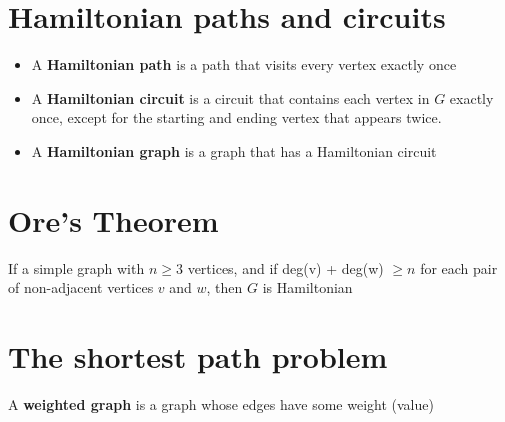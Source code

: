 \documentclass{report}
\begin{document}
    \pagebreak \bigbreak \noindent 
    \section{\LARGE Hamiltonian paths and circuits}
    \bigbreak \noindent 
    \smallbreak \noindent
    \begin{definition}
        \begin{itemize}
            \item A \textbf{Hamiltonian path} is a path that visits every vertex exactly once  
            \item A \textbf{Hamiltonian circuit} is a circuit that contains each vertex in $G$ exactly once, except for the starting and ending vertex that appears twice.
            \item A \textbf{Hamiltonian graph} is a graph that has a Hamiltonian circuit
        \end{itemize}

    \end{definition}

    \pagebreak \bigbreak \noindent 
    \section{\LARGE Ore's Theorem}
    \bigbreak \noindent 
    \begin{thrm}
       If a simple graph with $n \geq 3$ vertices, and if deg(v) + deg(w) $ \geq n$ for each pair of non-adjacent vertices $v$ and $w$, then $G$ is Hamiltonian 
    \end{thrm}

    \pagebreak \bigbreak \noindent 
    \section{\LARGE The shortest path problem}
    \bigbreak \noindent 
    \smallbreak \noindent
    \begin{definition}
        A \textbf{weighted graph} is a graph whose edges have some weight (value) 
    \end{definition}
    \bigbreak \noindent 
\end{document}
